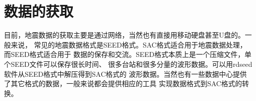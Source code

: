 \section{数据的获取}
目前，地震数据的获取主要是通过网络，当然也有直接用移动硬盘甚至U盘的。一般来说，
常见的地震数据格式是SEED格式。SAC格式适合用于地震数据处理，而SEED格式适合用于
数据的保存和交流。SEED格式本质上是一个压缩文件，单个SEED文件可以保存很长时间、
很多台站和很多分量的波形数据。可以用rdseed软件从SEED格式中解压得到SAC格式的
波形数据。当然也有一些数据中心提供了其它格式的数据，一般来说都会提供相应的工具
实现数据格式到SAC格式的转换。
